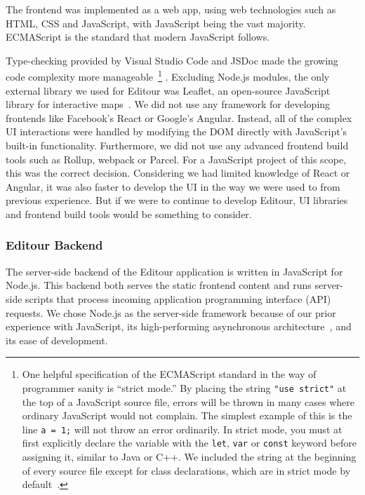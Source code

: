 \documentclass[a4paper, 10pt, american, titlepage]{article}
\begin{document}
The frontend was implemented as a web app, using web technologies such as HTML,
CSS and JavaScript, with JavaScript being the vast majority. ECMAScript is the
standard that modern JavaScript follows.

Type-checking provided by Visual Studio Code and JSDoc made the growing code
complexity more manageable~\footnote{One helpful specification of the ECMAScript
standard in the way of programmer sanity is ``strict mode.'' By placing the
string \texttt{"use strict"} at the top of a JavaScript source file, errors will
be thrown in many cases where ordinary JavaScript would not complain. The
simplest example of this is the line \texttt{a = 1;} will not throw an error
ordinarily. In strict mode, you must at first explicitly declare the variable
with the \texttt{let}, \texttt{var} or \texttt{const} keyword before assigning
it, similar to Java or C++. We included the string at the beginning of every
source file except for class declarations, which are in strict mode by
default~\autocite[386]{ecmainternational2019}.} . Excluding Node.js modules, the
only external library we used for Editour was Leaflet, an open-source JavaScript
library for interactive maps~\autocite{leafletjs}. We did not use any framework
for developing frontends like Facebook's React or Google's Angular. Instead, all
of the complex UI interactions were handled by modifying the DOM directly with
JavaScript's built-in functionality. Furthermore, we did not use any advanced
frontend build tools such as Rollup, webpack or Parcel. For a JavaScript project
of this scope, this was the correct decision. Considering we had limited
knowledge of React or Angular, it was also faster to develop the UI in the way
we were used to from previous experience. But if we were to continue to develop
Editour, UI libraries and frontend build tools would be something to consider.

\subsubsection{Editour Backend}
\label{sec:editourBackend}

The server-side backend of the Editour application is written in JavaScript for
Node.js. This backend both serves the static frontend content and runs
server-side scripts that process incoming application programming interface
(API) requests. We chose Node.js as the server-side framework because of our
prior experience with JavaScript, its high-performing asynchronous
architecture~\autocite{orsini2013}, and its ease of development.
\end{document}
